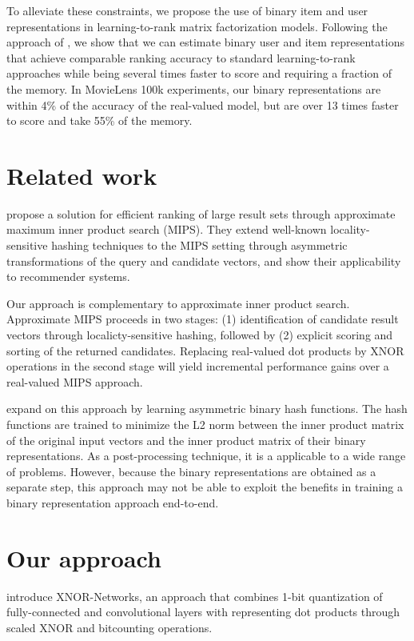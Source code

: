 \documentclass[sigchi]{acmart}
\begin{document}
To alleviate these constraints, we propose the use of binary item and user representations in learning-to-rank matrix factorization models. Following the approach of \citet{rastegari2016xnor}, we show that we can estimate binary user and item representations that achieve comparable ranking accuracy to standard learning-to-rank approaches while being several times faster to score and requiring a fraction of the memory. In MovieLens 100k experiments, our binary representations are within 4\% of the accuracy of the real-valued model, but are over 13 times faster to score and take 55\% of the memory.

\section{Related work}
\citet{shrivastava2014asymmetric} propose a solution for efficient ranking of large result sets through approximate maximum inner product search (MIPS). They extend well-known \citep{indyk1998approximate} locality-sensitive hashing techniques to the MIPS setting through asymmetric transformations of the query and candidate vectors, and show their applicability to recommender systems.

Our approach is complementary to approximate inner product search. Approximate MIPS proceeds in two stages: (1) identification of candidate result vectors through localicty-sensitive hashing, followed by (2) explicit scoring and sorting of the returned candidates. Replacing real-valued dot products by XNOR operations in the second stage will yield incremental performance gains over a real-valued MIPS approach.

\citet{Shen_2015_ICCV} expand on this approach by learning asymmetric binary hash functions. The hash functions are trained to minimize the L2 norm between the inner product matrix of the original input vectors and the inner product matrix of their binary representations. As a post-processing technique, it is a applicable to a wide range of problems. However, because the binary representations are obtained as a separate step, this approach may not be able to exploit the benefits in training a binary representation approach end-to-end.

\section{Our approach}
\label{sec:approach}
\citet{rastegari2016xnor} introduce XNOR-Networks, an approach that combines 1-bit quantization of fully-connected and convolutional layers with representing dot products through scaled XNOR and bitcounting operations.
\end{document}

